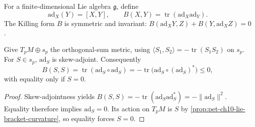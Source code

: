 \begin{definition}
  \label{def:pet-ch10-killing-form}

  For a finite-dimensional Lie algebra $\mathfrak g$, define
  \[
    \mathrm{ad}_X(Y)=[X,Y],\qquad
    B(X,Y)=\operatorname{tr}(\mathrm{ad}_X\mathrm{ad}_Y).
  \]
  The Killing form $B$ is symmetric and invariant:
  $B(\mathrm{ad}_XY,Z)+B(Y,\mathrm{ad}_XZ)=0$.
\end{definition}

\begin{remark}
  \label{rem:pet-ch10-adjoint-skew-symmetric}

  Give $T_pM\oplus s_p$ the orthogonal-sum metric, using
  $\langle S_1,S_2\rangle=-\operatorname{tr}(S_1S_2)$ on $s_p$. For $S\in s_p$,
  $\mathrm{ad}_S$ is skew-adjoint. Consequently
  \[
    B(S,S)=\operatorname{tr}(\mathrm{ad}_S\circ\mathrm{ad}_S)=-\operatorname{tr}\big(\mathrm{ad}_S\circ(\mathrm{ad}_S)^*\big)\le0,
  \]
  with equality only if $S=0$.
\end{remark}
\begin{proof}
  \sketch
  Skew-adjointness yields
  $B(S,S)=-\operatorname{tr}(\mathrm{ad}_S\mathrm{ad}_S^*)=-\|\mathrm{ad}_S\|^2$.
  Equality therefore implies $\mathrm{ad}_S=0$. Its action on $T_pM$ is $S$
  by \cref{prop:pet-ch10-lie-bracket-curvature}, so equality forces $S=0$.
\end{proof}

